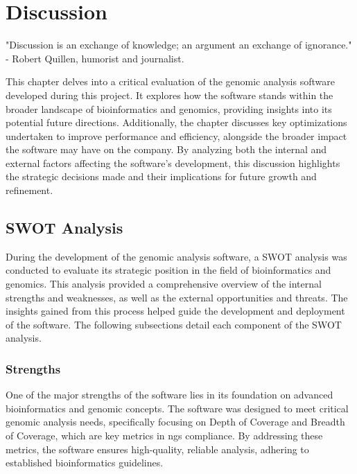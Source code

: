 \chapter{Discussion}
\label{chapter:Discussion}

\begin{introduction}
    "Discussion is an exchange of knowledge; an argument an exchange of ignorance." - Robert Quillen, humorist and journalist.
\end{introduction}

This chapter delves into a critical evaluation of the genomic analysis software developed during this project. It explores how the software stands within the broader landscape of bioinformatics and genomics, providing insights into its potential future directions. Additionally, the chapter discusses key optimizations undertaken to improve performance and efficiency, alongside the broader impact the software may have on the company. By analyzing both the internal and external factors affecting the software's development, this discussion highlights the strategic decisions made and their implications for future growth and refinement.

\section{\acs{SWOT} Analysis} \label{sec:intro_swot}

During the development of the genomic analysis software, a \ac{SWOT} analysis was conducted to evaluate its strategic position in the field of bioinformatics and genomics. This analysis provided a comprehensive overview of the internal strengths and weaknesses, as well as the external opportunities and threats. The insights gained from this process helped guide the development and deployment of the software. The following subsections detail each component of the \ac{SWOT} analysis.

\subsection{Strengths}

One of the major strengths of the software lies in its foundation on advanced bioinformatics and genomic concepts. The software was designed to meet critical genomic analysis needs, specifically focusing on Depth of Coverage and Breadth of Coverage, which are key metrics in \ac{ngs} compliance. By addressing these metrics, the software ensures high-quality, reliable analysis, adhering to established bioinformatics guidelines.


